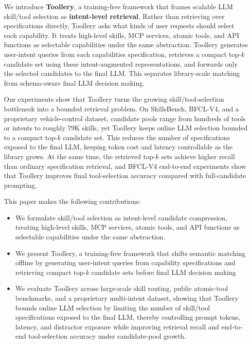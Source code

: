\documentclass[11pt]{article}
\begin{document}
We introduce \textbf{Toollery}, a training-free framework that frames scalable LLM skill/tool selection as \textbf{intent-level retrieval}. Rather than retrieving over specifications directly, Toollery asks what kinds of user requests should select each capability. It treats high-level skills, MCP services, atomic tools, and API functions as selectable capabilities under the same abstraction. Toollery generates user-intent queries from each capabilities specification, retrieves a compact top-$k$ candidate set using these intent-augmented representations, and forwards only the selected candidates to the final LLM. This separates library-scale matching from schema-aware final LLM decision making.

Our experiments show that Toollery turns the growing skill/tool-selection bottleneck into a bounded retrieval problem. On SkillsBench, BFCL-V4, and a proprietary vehicle-control dataset, candidate pools range from hundreds of tools or intents to roughly 79K skills, yet Toollery keeps online LLM selection bounded to a compact top-$k$ candidate set. This reduces the number of specifications exposed to the final LLM, keeping token cost and latency controllable as the library grows. At the same time, the retrieved top-$k$ sets achieve higher recall than ordinary specification retrieval, and BFCL-V4 end-to-end experiments show that Toollery improves final tool-selection accuracy compared with full-candidate prompting.


This paper makes the following contributions:
\begin{itemize}
    \item We formulate skill/tool selection as intent-level candidate compression, treating high-level skills, MCP services, atomic tools, and API functions as selectable capabilities under the same abstraction.
    \item We present Toollery, a training-free framework that shifts semantic matching offline by generating user-intent queries from capability specifications and retrieving compact top-$k$ candidate sets before final LLM decision making
    \item We evaluate Toollery across large-scale skill routing, public atomic-tool benchmarks, and a proprietary multi-intent dataset, showing that Toollery bounds online LLM selection by limiting the number of skill/tool specifications exposed to the final LLM, thereby controlling prompt tokens, latency, and distractor exposure while improving retrieval recall and end-to-end tool-selection accuracy under candidate-pool growth.
\end{itemize}
\end{document}
